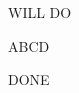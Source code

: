 \documentclass{article}
\begin{document}
WILL DO
\begin{InlineCode}{}
ABCD
\end{InlineCode}
DONE
\end{document}
